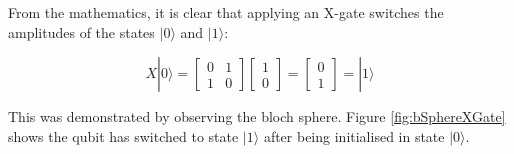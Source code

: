 From the mathematics, it is clear that applying an X-gate switches the amplitudes of the states $|0\rangle$ and $|1\rangle$:

$$ X|0\rangle = \begin{bmatrix} 0 & 1 \\ 1 & 0 \end{bmatrix}\begin{bmatrix} 1 \\ 0 \end{bmatrix} = \begin{bmatrix} 0 \\ 1 \end{bmatrix} = |1\rangle$$

This was demonstrated by observing the bloch sphere. Figure \ref{fig:bSphereXGate} shows the qubit has switched to state $|1\rangle$ after being initialised in state $|0\rangle$.

